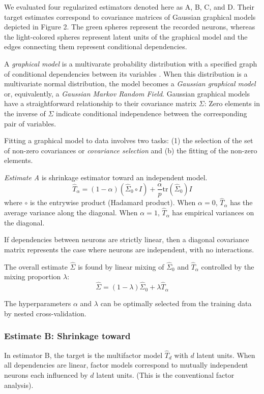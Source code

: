 We evaluated four regularized estimators denoted here as A, B, C, and D.  Their target estimates correspond to covariance matrices of Gaussian graphical models depicted in Figure 2.  The green spheres represent the recorded neurons, whereas the light-colored spheres represent latent units of the graphical model and the edges connecting them represent conditional dependencies. 



A \emph{graphical model} is a multivarate probability distribution with a specified graph of conditional dependencies between its variables \cite{Koller:2009}.  When this distribution is a multivariate normal distribution, the model becomes a \emph{Gaussian graphical model} or, equivalently, a \emph{Gaussian Markov Random Field}.  Gaussian graphical models have a straightforward relationship to their covariance matrix $\Sigma$:  Zero elements in the inverse of $\Sigma$ indicate conditional independence between the corresponding pair of variables.  

Fitting a graphical model to data involves two tasks: (1) the selection of the set of non-zero covariances or \emph{covariance selection} \cite{Dempster:1972} and (b) the fitting of the non-zero elements.

\emph{Estimate A} is shrinkage estimator toward an independent model.  
\begin{equation}
\hat T_\alpha = (1-\alpha)(\hat\Sigma_0 \circ I) + \frac \alpha p \mbox{tr}(\hat \Sigma_0)I
\end{equation}
where $\circ$ is the entrywise product (Hadamard product). When $\alpha=0$, $\hat T_\alpha$ has the average variance along the diagonal. When $ \alpha=1$, $ \hat T_\alpha$ has empirical variances on the diagonal.

If dependencies between neurons are strictly linear, then a diagonal covariance matrix represents the case where neurons are independent, with no interactions.

The overall estimate $\hat\Sigma$ is found by linear mixing of $\hat\Sigma_0$ and $ \hat T_\alpha$ controlled by the mixing proportion $\lambda$:
\begin{equation}
\hat\Sigma = (1-\lambda)\hat\Sigma_0 + \lambda\hat T_\alpha 
\end{equation}

The hyperparameters $ \alpha$ and $ \lambda$ can be optimally selected from the training data by nested cross-validation.

\subsubsection*{Estimate B: Shrinkage toward }
In estimator B, the target is the multifactor model $ \hat T_d$ with $ d$ latent units. When all dependencies are linear, factor models correspond to mutually independent neurons each influenced by $ d$ latent units. (This is  the conventional factor analysis).

